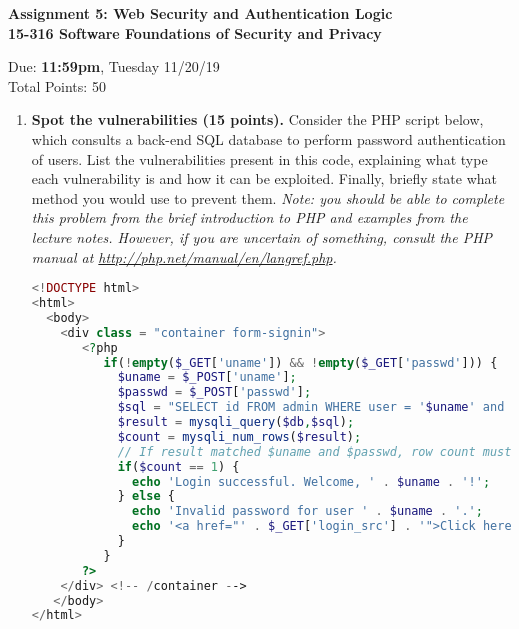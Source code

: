 \documentclass[10pt]{article}
\begin{document}
\begin{center}
\textbf{ Assignment 5: Web Security and Authentication Logic\\15-316 Software Foundations of Security and Privacy}\\
\end{center}
Due: \textbf{ 11:59pm}, Tuesday 11/20/19 \\
Total Points: 50

\vspace{-5mm}

\begin{enumerate}
\item \textbf{Spot the vulnerabilities (15 points).} Consider the PHP script below, which consults a back-end SQL database to perform password authentication of users. List the vulnerabilities present in this code, explaining what type each vulnerability is and how it can be exploited. Finally, briefly state what method you would use to prevent them. \emph{Note: you should be able to complete this problem from the brief introduction to PHP and examples from the lecture notes. However, if you are uncertain of something, consult the PHP manual at \href{http://php.net/manual/en/langref.php}{http://php.net/manual/en/langref.php}.}

\begin{lstlisting}[language=PHP]
<!DOCTYPE html>
<html>
  <body>
    <div class = "container form-signin">
       <?php
          if(!empty($_GET['uname']) && !empty($_GET['passwd'])) {
            $uname = $_POST['uname'];
            $passwd = $_POST['passwd'];
            $sql = "SELECT id FROM admin WHERE user = '$uname' and pass = '$passwd'";
            $result = mysqli_query($db,$sql);
            $count = mysqli_num_rows($result);            
            // If result matched $uname and $passwd, row count must be 1
            if($count == 1) {
              echo 'Login successful. Welcome, ' . $uname . '!';
            } else {
              echo 'Invalid password for user ' . $uname . '.';
              echo '<a href="' . $_GET['login_src'] . '">Click here</a> to try again.'
            }
          }
       ?>
    </div> <!-- /container -->
   </body>
</html>
\end{lstlisting}
\ \\[1em]

\newpage


\end{enumerate}
\end{document}
